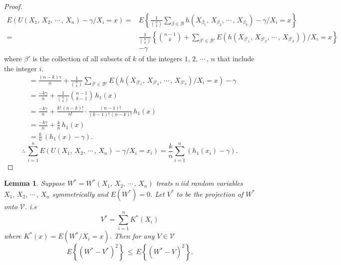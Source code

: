 \documentclass[12pt,a4paper]{report}
\theoremstyle{definition}
\theoremstyle{plain}
\newtheorem{lem}[thm]{Lemma}
\begin{document}
\begin{proof}
\begin{align*}
E\left(U(X_1, \, X_2, \, \cdots\, , \, X_n) - \gamma/ X_i = x\right)  =&  E\left\{\frac{1}{\binom{n}{k}}\sum_{\beta\in\mathcal{B}}h(X_{\beta_1}, \, X_{\beta_2}, \, \cdots\, , \, X_{\beta_k})-\gamma / X_i = x\right\}\\
 = & \frac{1}{\binom{n}{k}}\left\{\binom{n-1}{k} + \sum_{\beta'\in\mathcal{B}'}E\left(h(X_{\beta'_1}, \, X_{\beta'_2}, \, \cdots\, , \, X_{\beta'_k})\right)/ X_i = x\right\}\\
& - \gamma
\end{align*}
where $\beta'$ is the collection of all subsets of $k$ of the integers $1, \, 2, \, \cdots\, , \, n$ that include the integer $i$.
\begin{align*}
& = \frac{(n - k)\gamma}{n} + \frac{1}{\binom{n}{k}}\sum_{\beta'\in\mathcal{B}'}E\left(h(X_{\beta'_1}, \, X_{\beta'_2}, \, \cdots\, , \, X_{\beta'_k})/X_i = x\right) - \gamma\\
& = \frac{-k\gamma}{n} + \frac{1}{\binom{n}{k}}\binom{n-1}{k -1} \, h_1(x)\\
& = \frac{-k\gamma}{n} + \frac{k!\, (n-k)!}{n!} \cdot\frac{(n-1)!}{(k - 1)!\, (n - k)!}\, h_1(x)\\
& = \frac{-k\gamma}{n} + \frac{k}{n}\, h_1(x)\\
& = \frac{k}{n}\, \left(h_1(x) - \gamma\right).
\end{align*}
$$\therefore\, \sum^n_{i = 1}E\left(U(X_1, \, X_2, \, \cdots\, , \, X_n)- \gamma/X_i = x_i\right)  = \frac{k}{n}\sum^n_{i = 1}\left(h_1(x_i) - \gamma\right).$$
\end{proof}

\begin{lem}
Suppose $W^* = W^*(X_1, \, X_2,\, \cdots\, ,\, X_n)$ treats $n\, $iid random variables $X_1, \, X_2,\, \cdots\, ,\, X_n$ symmetrically and $E(W^*) = 0$. Let $V^*$ to be the projection of $W^*$ onto $\mathcal{V}$. i.e $$V^* = \sum^n_{i = 1}K^*(X_i)$$ where $K^*(x) = E(W^*/ X_i = x)$. Then for any $V\in \mathcal{V}$ $$E\left\{(W^*-V^*)^2\right\} \, \leq \, E\left\{(W^* - V)^2\right\}.$$
\end{lem}
\end{document}
